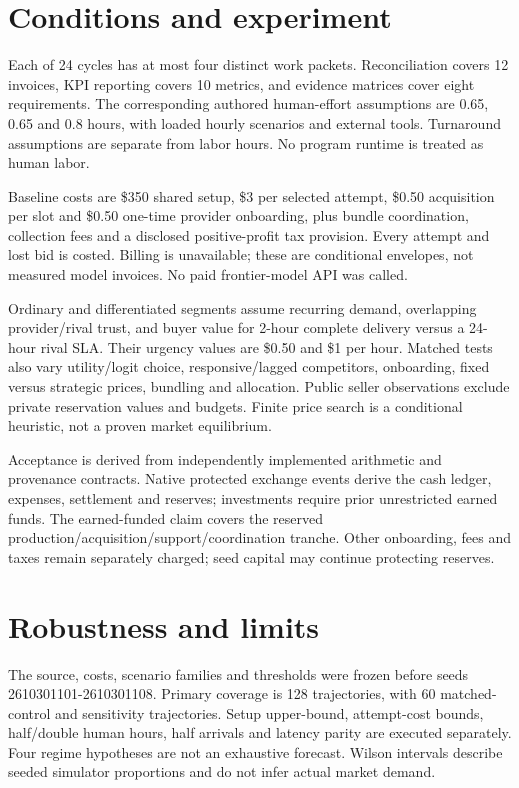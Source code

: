 \documentclass[10pt]{article}
\begin{document}
\section*{Conditions and experiment}
Each of 24 cycles has at most four distinct work packets. Reconciliation covers 12 invoices, KPI reporting covers 10 metrics, and evidence matrices cover eight requirements. The corresponding authored human-effort assumptions are 0.65, 0.65 and 0.8 hours, with loaded hourly scenarios and external tools. Turnaround assumptions are separate from labor hours. No program runtime is treated as human labor.

Baseline costs are \$350 shared setup, \$3 per selected attempt, \$0.50 acquisition per slot and \$0.50 one-time provider onboarding, plus bundle coordination, collection fees and a disclosed positive-profit tax provision. Every attempt and lost bid is costed. Billing is unavailable; these are conditional envelopes, not measured model invoices. No paid frontier-model API was called.

Ordinary and differentiated segments assume recurring demand, overlapping provider/rival trust, and buyer value for 2-hour complete delivery versus a 24-hour rival SLA. Their urgency values are \$0.50 and \$1 per hour. Matched tests also vary utility/logit choice, responsive/lagged competitors, onboarding, fixed versus strategic prices, bundling and allocation. Public seller observations exclude private reservation values and budgets. Finite price search is a conditional heuristic, not a proven market equilibrium.

Acceptance is derived from independently implemented arithmetic and provenance contracts. Native protected exchange events derive the cash ledger, expenses, settlement and reserves; investments require prior unrestricted earned funds. The earned-funded claim covers the reserved production/acquisition/support/coordination tranche. Other onboarding, fees and taxes remain separately charged; seed capital may continue protecting reserves.

\section*{Robustness and limits}
The source, costs, scenario families and thresholds were frozen before seeds 2610301101-2610301108. Primary coverage is 128 trajectories, with 60 matched-control and sensitivity trajectories. Setup upper-bound, attempt-cost bounds, half/double human hours, half arrivals and latency parity are executed separately. Four regime hypotheses are not an exhaustive forecast. Wilson intervals describe seeded simulator proportions and do not infer actual market demand.
\end{document}
